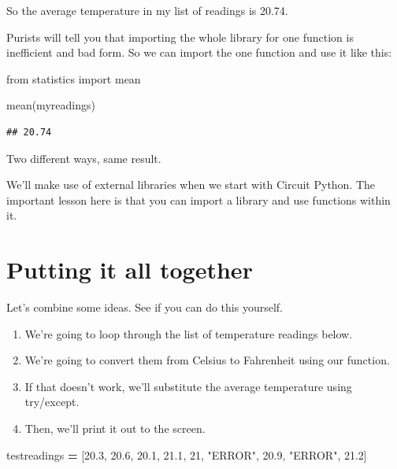 \documentclass[
]{book}
\newenvironment{Shaded}{\begin{snugshade}}{\end{snugshade}}
\newcommand{\DecValTok}[1]{\textcolor[rgb]{0.00,0.00,0.81}{#1}}
\newcommand{\FloatTok}[1]{\textcolor[rgb]{0.00,0.00,0.81}{#1}}
\newcommand{\ImportTok}[1]{#1}
\newcommand{\NormalTok}[1]{#1}
\newcommand{\OperatorTok}[1]{\textcolor[rgb]{0.81,0.36,0.00}{\textbf{#1}}}
\newcommand{\StringTok}[1]{\textcolor[rgb]{0.31,0.60,0.02}{#1}}
\providecommand{\tightlist}{%
  \setlength{\itemsep}{0pt}\setlength{\parskip}{0pt}}
\begin{document}
So the average temperature in my list of readings is 20.74.

Purists will tell you that importing the whole library for one function is inefficient and bad form. So we can import the one function and use it like this:

\begin{Shaded}
\begin{Highlighting}[]
\ImportTok{from}\NormalTok{ statistics }\ImportTok{import}\NormalTok{ mean}

\NormalTok{mean(myreadings)}
\end{Highlighting}
\end{Shaded}

\begin{verbatim}
## 20.74
\end{verbatim}

Two different ways, same result.

We'll make use of external libraries when we start with Circuit Python. The important lesson here is that you can import a library and use functions within it.

\hypertarget{putting-it-all-together}{%
\section{Putting it all together}\label{putting-it-all-together}}

Let's combine some ideas. See if you can do this yourself.

\begin{enumerate}
\def\labelenumi{\arabic{enumi}.}
\tightlist
\item
  We're going to loop through the list of temperature readings below.
\item
  We're going to convert them from Celsius to Fahrenheit using our function.
\item
  If that doesn't work, we'll substitute the average temperature using try/except.
\item
  Then, we'll print it out to the screen.
\end{enumerate}

\begin{Shaded}
\begin{Highlighting}[]
\NormalTok{testreadings }\OperatorTok{=}\NormalTok{ [}\FloatTok{20.3}\NormalTok{, }\FloatTok{20.6}\NormalTok{, }\FloatTok{20.1}\NormalTok{, }\FloatTok{21.1}\NormalTok{, }\DecValTok{21}\NormalTok{, }\StringTok{"ERROR"}\NormalTok{, }\FloatTok{20.9}\NormalTok{, }\StringTok{"ERROR"}\NormalTok{, }\FloatTok{21.2}\NormalTok{]}
\end{Highlighting}
\end{Shaded}
\end{document}
